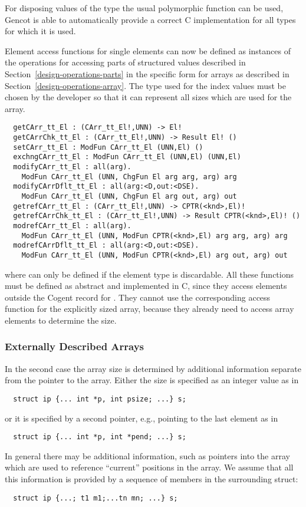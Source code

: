 For disposing values of the type  the usual polymorphic function  can be used, 
Gencot is able to automatically provide a correct C implementation for all types for which it is used.

Element access functions for single elements can now be defined as instances of the operations for accessing parts 
of structured values described in Section~\ref{design-operations-parts} in the specific form for arrays as described
in Section~\ref{design-operations-array}. The type  used for the index
values must be chosen by the developer so that it can represent all sizes which are used for the array.
\begin{verbatim}
  getCArr_tt_El : (CArr_tt_El!,UNN) -> El!
  getCArrChk_tt_El : (CArr_tt_El!,UNN) -> Result El! ()
  setCArr_tt_El : ModFun CArr_tt_El (UNN,El) ()
  exchngCArr_tt_El : ModFun CArr_tt_El (UNN,El) (UNN,El)
  modifyCArr_tt_El : all(arg). 
    ModFun CArr_tt_El (UNN, ChgFun El arg arg, arg) arg
  modifyCArrDflt_tt_El : all(arg:<D,out:<DSE). 
    ModFun CArr_tt_El (UNN, ChgFun El arg out, arg) out
  getrefCArr_tt_El : (CArr_tt_El!,UNN) -> CPTR(<knd>,El)!
  getrefCArrChk_tt_El : (CArr_tt_El!,UNN) -> Result CPTR(<knd>,El)! ()
  modrefCArr_tt_El : all(arg). 
    ModFun CArr_tt_El (UNN, ModFun CPTR(<knd>,El) arg arg, arg) arg
  modrefCArrDflt_tt_El : all(arg:<D,out:<DSE). 
    ModFun CArr_tt_El (UNN, ModFun CPTR(<knd>,El) arg out, arg) out
\end{verbatim}
where  can only be defined if the element type  is discardable. All these functions
must be defined as abstract and implemented in C, since they access elements outside the Cogent record for .
They cannot use the corresponding access function for the explicitly sized array, because they already need to access
array elements to determine the size.

\subsubsection{Externally Described Arrays}

In the second case the array size is determined by additional information separate from the pointer to the array.
Either the size is specified as an integer value as in 
\begin{verbatim}
  struct ip {... int *p, int psize; ...} s;
\end{verbatim}
or it is specified by a second pointer, e.g., pointing to the last element as in
\begin{verbatim}
  struct ip {... int *p, int *pend; ...} s;
\end{verbatim}
In general there may be additional information, such as pointers into the array which are used to reference
``current'' positions in the array. We assume that all this information is provided by a sequence of members
in the surrounding struct:
\begin{verbatim}
  struct ip {...; t1 m1;...tn mn; ...} s;
\end{verbatim}

